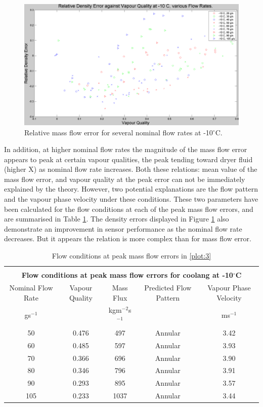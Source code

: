 \documentclass{report}
\begin{document}
\begin{figure}
\includegraphics[width=\textwidth]{plots/fig4}
\caption{Relative mass flow error for several nominal flow rates at -10$^\circ$C.}
\label{plot:4}
\end{figure}
\FloatBarrier
In addition, at higher nominal flow rates the magnitude of the mass flow error appears to peak at certain vapour qualities, the peak tending toward dryer fluid (higher X) as nominal flow rate increases. Both these relations: mean value of the mass flow error, and vapour quality at the peak error can not be immediately explained by the theory. However, two potential explanations are the flow pattern and the vapour phase velocity under these conditions. These two parameters have been calculated for the flow conditions at each of the peak mass flow errors, and are summarised in Table \ref{tab:flowConditions}. The density errors displayed in Figure \ref{plot:4} also demonstrate an improvement in sensor performance as the nominal flow rate decreases. But it appears the relation is more complex than for mass flow error.
\FloatBarrier
\begin{table}
\begin{tabular}{|c|c|c|c|c|}
\hline\\
\multicolumn{5}{|c|}{\textbf{Flow conditions at peak mass flow errors for coolang at -10$^\circ$C}}\\\hline
Nominal Flow Rate & Vapour Quality & Mass Flux & Predicted Flow Pattern & Vapour Phase Velocity \\\hline
gs$^{-1}$ &  & kgm$^{-2}$s$^{-1}$ & & ms$^{-1}$\\\hline
50 &0.476 & 497 & Annular & 3.42 \\\hline
60 &0.485 & 597 & Annular & 3.93 \\\hline
70 &0.366 & 696 & Annular & 3.90 \\\hline
80 &0.346 & 796 & Annular & 3.91 \\\hline
90 &0.293 & 895 & Annular & 3.57 \\\hline
105 & 0.233 & 1037 & Annular & 3.44 \\\hline
\end{tabular}
\caption{Flow conditions at peak mass flow errors in \ref{plot:3}}
\label{tab:flowConditions}
\end{table}
\end{document}
